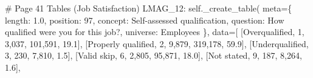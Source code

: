 \documentclass[
  11pt,
  a4paper,
]{article}
\newenvironment{Shaded}{\begin{snugshade}}{\end{snugshade}}
\newcommand{\CommentTok}[1]{\textcolor[rgb]{0.37,0.37,0.37}{#1}}
\newcommand{\NormalTok}[1]{\textcolor[rgb]{0.00,0.23,0.31}{#1}}
\newcommand{\OperatorTok}[1]{\textcolor[rgb]{0.37,0.37,0.37}{#1}}
\newcommand{\StringTok}[1]{\textcolor[rgb]{0.13,0.47,0.30}{#1}}
\newcommand{\VariableTok}[1]{\textcolor[rgb]{0.07,0.07,0.07}{#1}}
\begin{document}
\begin{Shaded}
\begin{Highlighting}[]
    \CommentTok{\# Page 41 Tables (Job Satisfaction)}
    \StringTok{\textquotesingle{}LMAG\_12\textquotesingle{}}\NormalTok{: }\VariableTok{self}\NormalTok{.\_create\_table(}
\NormalTok{        meta}\OperatorTok{=}\NormalTok{\{}
            \StringTok{\textquotesingle{}length\textquotesingle{}}\NormalTok{: }\StringTok{\textquotesingle{}1.0\textquotesingle{}}\NormalTok{, }\StringTok{\textquotesingle{}position\textquotesingle{}}\NormalTok{: }\StringTok{\textquotesingle{}97\textquotesingle{}}\NormalTok{,}
            \StringTok{\textquotesingle{}concept\textquotesingle{}}\NormalTok{: }\StringTok{\textquotesingle{}Self{-}assessed qualification\textquotesingle{}}\NormalTok{,}
            \StringTok{\textquotesingle{}question\textquotesingle{}}\NormalTok{: }\StringTok{\textquotesingle{}How qualified were you for this job?\textquotesingle{}}\NormalTok{,}
            \StringTok{\textquotesingle{}universe\textquotesingle{}}\NormalTok{: }\StringTok{\textquotesingle{}Employees\textquotesingle{}}
\NormalTok{        \},}
\NormalTok{        data}\OperatorTok{=}\NormalTok{[}
\NormalTok{            [}\StringTok{\textquotesingle{}Overqualified\textquotesingle{}}\NormalTok{, }\StringTok{\textquotesingle{}1\textquotesingle{}}\NormalTok{, }\StringTok{\textquotesingle{}3,037\textquotesingle{}}\NormalTok{, }\StringTok{\textquotesingle{}101,591\textquotesingle{}}\NormalTok{, }\StringTok{\textquotesingle{}19.1\textquotesingle{}}\NormalTok{],}
\NormalTok{            [}\StringTok{\textquotesingle{}Properly qualified\textquotesingle{}}\NormalTok{, }\StringTok{\textquotesingle{}2\textquotesingle{}}\NormalTok{, }\StringTok{\textquotesingle{}9,879\textquotesingle{}}\NormalTok{, }\StringTok{\textquotesingle{}319,178\textquotesingle{}}\NormalTok{, }\StringTok{\textquotesingle{}59.9\textquotesingle{}}\NormalTok{],}
\NormalTok{            [}\StringTok{\textquotesingle{}Underqualified\textquotesingle{}}\NormalTok{, }\StringTok{\textquotesingle{}3\textquotesingle{}}\NormalTok{, }\StringTok{\textquotesingle{}230\textquotesingle{}}\NormalTok{, }\StringTok{\textquotesingle{}7,810\textquotesingle{}}\NormalTok{, }\StringTok{\textquotesingle{}1.5\textquotesingle{}}\NormalTok{],}
\NormalTok{            [}\StringTok{\textquotesingle{}Valid skip\textquotesingle{}}\NormalTok{, }\StringTok{\textquotesingle{}6\textquotesingle{}}\NormalTok{, }\StringTok{\textquotesingle{}2,805\textquotesingle{}}\NormalTok{, }\StringTok{\textquotesingle{}95,871\textquotesingle{}}\NormalTok{, }\StringTok{\textquotesingle{}18.0\textquotesingle{}}\NormalTok{],}
\NormalTok{            [}\StringTok{\textquotesingle{}Not stated\textquotesingle{}}\NormalTok{, }\StringTok{\textquotesingle{}9\textquotesingle{}}\NormalTok{, }\StringTok{\textquotesingle{}187\textquotesingle{}}\NormalTok{, }\StringTok{\textquotesingle{}8,264\textquotesingle{}}\NormalTok{, }\StringTok{\textquotesingle{}1.6\textquotesingle{}}\NormalTok{],}

\end{Highlighting}
\end{Shaded}
\end{document}
